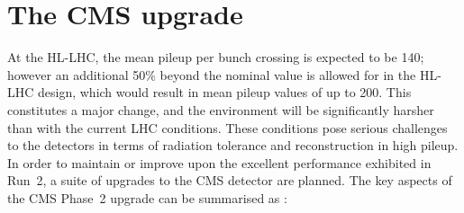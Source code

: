 \section{The CMS upgrade}

At the HL-LHC, the mean pileup per bunch crossing is expected to be 140; 
however an additional 50\% beyond the nominal value is allowed for in the HL-LHC design, 
which would result in mean pileup values of up to 200.
This constitutes a major change, and the environment will be significantly harsher than with the current LHC conditions.
These conditions pose serious challenges to the detectors in terms of radiation tolerance and reconstruction in high pileup.
In order to maintain or improve upon the excellent performance exhibited in Run~2, a suite of upgrades to the CMS detector are planned.
The key aspects of the CMS Phase~2 upgrade can be summarised as \cite{UpgradeTP,MTD}:
